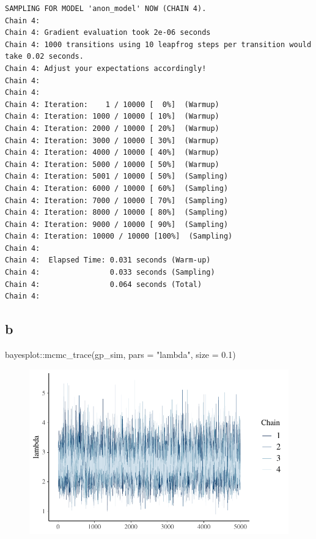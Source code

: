 \documentclass[
  letterpaper,
  DIV=11,
  numbers=noendperiod]{scrartcl}
\newenvironment{Shaded}{\begin{snugshade}}{\end{snugshade}}
\newcommand{\AttributeTok}[1]{\textcolor[rgb]{0.40,0.45,0.13}{#1}}
\newcommand{\FloatTok}[1]{\textcolor[rgb]{0.68,0.00,0.00}{#1}}
\newcommand{\FunctionTok}[1]{\textcolor[rgb]{0.28,0.35,0.67}{#1}}
\newcommand{\NormalTok}[1]{\textcolor[rgb]{0.00,0.23,0.31}{#1}}
\newcommand{\SpecialCharTok}[1]{\textcolor[rgb]{0.37,0.37,0.37}{#1}}
\newcommand{\StringTok}[1]{\textcolor[rgb]{0.13,0.47,0.30}{#1}}
\begin{document}
\begin{verbatim}
SAMPLING FOR MODEL 'anon_model' NOW (CHAIN 4).
Chain 4: 
Chain 4: Gradient evaluation took 2e-06 seconds
Chain 4: 1000 transitions using 10 leapfrog steps per transition would take 0.02 seconds.
Chain 4: Adjust your expectations accordingly!
Chain 4: 
Chain 4: 
Chain 4: Iteration:    1 / 10000 [  0%]  (Warmup)
Chain 4: Iteration: 1000 / 10000 [ 10%]  (Warmup)
Chain 4: Iteration: 2000 / 10000 [ 20%]  (Warmup)
Chain 4: Iteration: 3000 / 10000 [ 30%]  (Warmup)
Chain 4: Iteration: 4000 / 10000 [ 40%]  (Warmup)
Chain 4: Iteration: 5000 / 10000 [ 50%]  (Warmup)
Chain 4: Iteration: 5001 / 10000 [ 50%]  (Sampling)
Chain 4: Iteration: 6000 / 10000 [ 60%]  (Sampling)
Chain 4: Iteration: 7000 / 10000 [ 70%]  (Sampling)
Chain 4: Iteration: 8000 / 10000 [ 80%]  (Sampling)
Chain 4: Iteration: 9000 / 10000 [ 90%]  (Sampling)
Chain 4: Iteration: 10000 / 10000 [100%]  (Sampling)
Chain 4: 
Chain 4:  Elapsed Time: 0.031 seconds (Warm-up)
Chain 4:                0.033 seconds (Sampling)
Chain 4:                0.064 seconds (Total)
Chain 4: 
\end{verbatim}

\hypertarget{b-7}{%
\subsection{b}\label{b-7}}

\begin{Shaded}
\begin{Highlighting}[]
\NormalTok{bayesplot}\SpecialCharTok{::}\FunctionTok{mcmc\_trace}\NormalTok{(gp\_sim, }\AttributeTok{pars =} \StringTok{"lambda"}\NormalTok{, }\AttributeTok{size =} \FloatTok{0.1}\NormalTok{)}
\end{Highlighting}
\end{Shaded}

\begin{figure}[H]

{\centering \includegraphics{ps4_code_files/figure-pdf/unnamed-chunk-22-1.pdf}

}

\end{figure}
\end{document}
